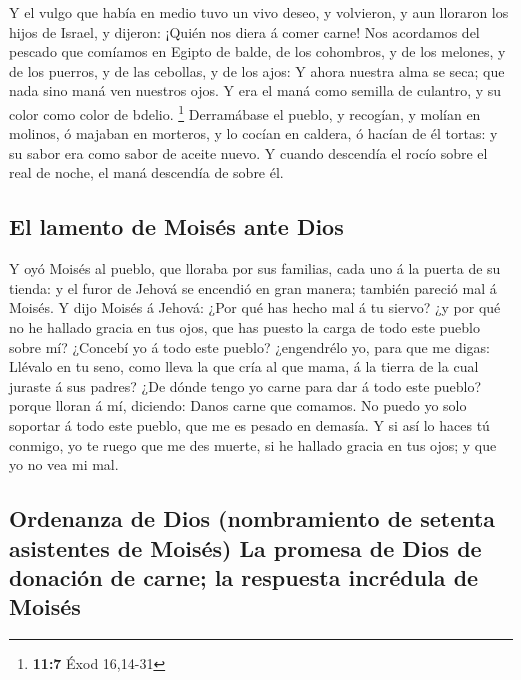  Y el vulgo que había en medio tuvo un vivo deseo, y
volvieron, y aun lloraron los hijos de Israel, y dijeron: ¡Quién nos
diera á comer carne!  Nos acordamos del pescado que comíamos
en Egipto de balde, de los cohombros, y de los melones, y de los
puerros, y de las cebollas, y de los ajos:  Y ahora nuestra
alma se seca; que nada sino maná ven nuestros ojos.  Y era
el maná como semilla de culantro, y su color como color de bdelio.
\footnote{\textbf{11:7} Éxod 16,14-31}  Derramábase el
pueblo, y recogían, y molían en molinos, ó majaban en morteros, y lo
cocían en caldera, ó hacían de él tortas: y su sabor era como sabor de
aceite nuevo.  Y cuando descendía el rocío sobre el real de
noche, el maná descendía de sobre él.

\hypertarget{el-lamento-de-moisuxe9s-ante-dios}{%
\subsection{El lamento de Moisés ante
Dios}\label{el-lamento-de-moisuxe9s-ante-dios}}

 Y oyó Moisés al pueblo, que lloraba por sus familias, cada
uno á la puerta de su tienda: y el furor de Jehová se encendió en gran
manera; también pareció mal á Moisés.  Y dijo Moisés á
Jehová: ¿Por qué has hecho mal á tu siervo? ¿y por qué no he hallado
gracia en tus ojos, que has puesto la carga de todo este pueblo sobre
mí?  ¿Concebí yo á todo este pueblo? ¿engendrélo yo, para
que me digas: Llévalo en tu seno, como lleva la que cría al que mama, á
la tierra de la cual juraste á sus padres?  ¿De dónde tengo
yo carne para dar á todo este pueblo? porque lloran á mí, diciendo:
Danos carne que comamos.  No puedo yo solo soportar á todo
este pueblo, que me es pesado en demasía.  Y si así lo
haces tú conmigo, yo te ruego que me des muerte, si he hallado gracia en
tus ojos; y que yo no vea mi mal.

\hypertarget{ordenanza-de-dios-nombramiento-de-setenta-asistentes-de-moisuxe9s-la-promesa-de-dios-de-donaciuxf3n-de-carne-la-respuesta-incruxe9dula-de-moisuxe9s}{%
\subsection{Ordenanza de Dios (nombramiento de setenta asistentes de
Moisés) La promesa de Dios de donación de carne; la respuesta incrédula
de
Moisés}\label{ordenanza-de-dios-nombramiento-de-setenta-asistentes-de-moisuxe9s-la-promesa-de-dios-de-donaciuxf3n-de-carne-la-respuesta-incruxe9dula-de-moisuxe9s}}

